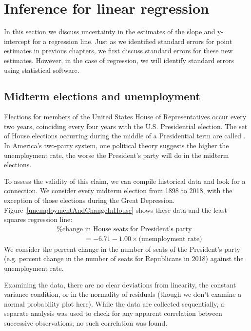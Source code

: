 \section{Inference for linear regression}
\label{inferenceForLinearRegression}

In this section we discuss uncertainty in the estimates of the slope and y-intercept for a regression line. Just as we identified standard errors for point estimates in previous chapters, we first discuss standard errors for these new estimates. However, in the case of regression, we will identify standard errors using statistical software.

\subsection{Midterm elections and unemployment}


Elections for members of the United States House of Representatives occur every two years, coinciding every four years with the U.S. Presidential election.
The set of House elections occurring during the middle of a Presidential term are called .
In America's two-party system, one political theory suggests the higher the unemployment rate, the worse the President's party will do in the midterm elections.

To assess the validity of this claim, we can compile
historical data and look for a connection.
We consider every midterm election from 1898 to 2018,
with the exception of those elections during the Great
Depression.
Figure~\ref{unemploymentAndChangeInHouse} shows these data
and the least-squares regression line: \vspace{-2mm}
\begin{align*}
&\text{\% change in House seats for President's party}  \\
&\qquad\qquad= -6.71 - 1.00\times \text{(unemployment rate)}
\end{align*}
We consider the percent change in the number of seats
of the President's party (e.g. percent change in the number
of seats for Republicans in 2018) against the unemployment
rate.

Examining the data, there are no clear deviations from linearity, the constant variance condition, or in the normality of residuals (though we don't examine a normal probability plot here). While the data are collected sequentially, a separate analysis was used to check for any apparent correlation between successive observations; no such correlation was found.

